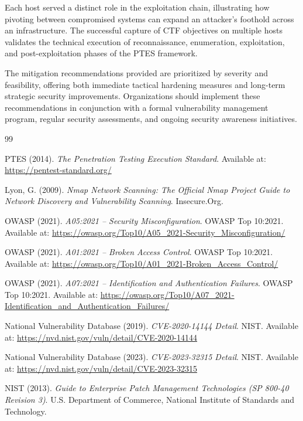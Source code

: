 \documentclass[11pt,a4paper]{article}
\begin{document}
Each host served a distinct role in the exploitation chain, illustrating how pivoting between compromised systems can expand an attacker's foothold across an infrastructure. The successful capture of CTF objectives on multiple hosts validates the technical execution of reconnaissance, enumeration, exploitation, and post-exploitation phases of the PTES framework.

The mitigation recommendations provided are prioritized by severity and feasibility, offering both immediate tactical hardening measures and long-term strategic security improvements. Organizations should implement these recommendations in conjunction with a formal vulnerability management program, regular security assessments, and ongoing security awareness initiatives.


\newpage
\begin{thebibliography}{99}

PTES (2014). \textit{The Penetration Testing Execution Standard}. Available at: \url{https://pentest-standard.org/}

Lyon, G. (2009). \textit{Nmap Network Scanning: The Official Nmap Project Guide to Network Discovery and Vulnerability Scanning}. Insecure.Org.

OWASP (2021). \textit{A05:2021 -- Security Misconfiguration}. OWASP Top 10:2021. Available at: \url{https://owasp.org/Top10/A05_2021-Security_Misconfiguration/}

OWASP (2021). \textit{A01:2021 -- Broken Access Control}. OWASP Top 10:2021. Available at: \url{https://owasp.org/Top10/A01_2021-Broken_Access_Control/}

OWASP (2021). \textit{A07:2021 -- Identification and Authentication Failures}. OWASP Top 10:2021. Available at: \url{https://owasp.org/Top10/A07_2021-Identification_and_Authentication_Failures/}

National Vulnerability Database (2019). \textit{CVE-2020-14144 Detail}. NIST. Available at: \url{https://nvd.nist.gov/vuln/detail/CVE-2020-14144}

National Vulnerability Database (2023). \textit{CVE-2023-32315 Detail}. NIST. Available at: \url{https://nvd.nist.gov/vuln/detail/CVE-2023-32315}

NIST (2013). \textit{Guide to Enterprise Patch Management Technologies (SP 800-40 Revision 3)}. U.S. Department of Commerce, National Institute of Standards and Technology.

\end{thebibliography}


\newpage
\appendix


\end{document}
